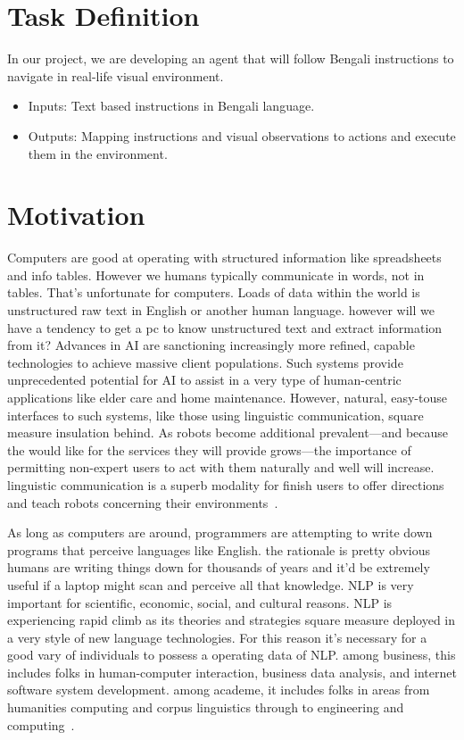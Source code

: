 \section{Task Definition}
In our project, we are developing an agent that will follow Bengali instructions to navigate in real-life visual environment.
\begin{itemize}
	\item Inputs: Text based instructions in Bengali language.
	\item Outputs: Mapping instructions and visual observations to actions and execute them in the environment.
\end{itemize}

\section{Motivation}
Computers are good at operating with structured information like spreadsheets and info tables. However we humans typically communicate in words, not in tables. That’s unfortunate for computers. Loads of data within the world is unstructured raw text in English or another human language. however will we have a tendency to get a pc to know unstructured text and extract information from it?
Advances in AI are sanctioning increasingly more refined, capable technologies to achieve massive client populations. Such systems provide unprecedented potential for AI to assist in a very type of human-centric applications like elder care and home maintenance. However, natural, easy-touse interfaces to such systems, like those using linguistic communication, square measure insulation behind. As robots become additional prevalent—and because the would like for the services they will provide grows—the importance of permitting non-expert users to act with them naturally and well will increase. linguistic communication is a superb modality for finish users to offer directions and teach robots concerning their environments~\cite{ijcai2018-810}. 

As long as computers are around, programmers are attempting to write down programs that perceive languages like English. the rationale is pretty obvious humans are writing things down for thousands of years and it'd be extremely useful if a laptop might scan and perceive all that knowledge.
NLP is very important for scientific, economic, social, and cultural reasons. NLP is experiencing rapid climb as its theories and strategies square measure deployed in a very style of new language technologies. For this reason it's necessary for a good vary of individuals to possess a operating data of NLP. among business, this includes folks in human-computer interaction, business data analysis, and internet software system development. among academe, it includes folks in areas from humanities computing and corpus linguistics through to engineering and computing~\cite{NLPbook}.

